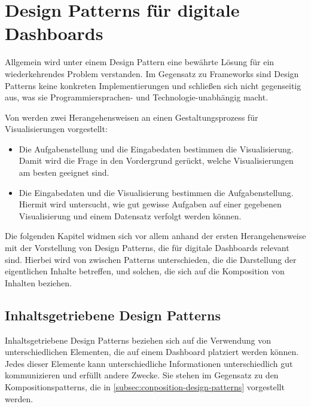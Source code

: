 \newpage


\section{Design Patterns für digitale Dashboards}\label{sec:design-patterns-list}

Allgemein wird unter einem Design Pattern eine bewährte Lösung für ein wiederkehrendes Problem verstanden.
Im Gegensatz zu Frameworks sind Design Patterns keine konkreten Implementierungen und schließen sich nicht gegenseitig aus, was sie Programmiersprachen- und Technologie-unabhängig macht.

Von \citeauthor[S. 2367]{Schulz.DesignSpaceVisualizationTasks.2013} werden zwei Herangehensweisen an einen Gestaltungsprozess für Visualisierungen vorgestellt:

\begin{itemize}
    \item Die Aufgabenstellung und die Eingabedaten bestimmen die Visualisierung.
    Damit wird die Frage in den Vordergrund gerückt, welche Visualisierungen am besten geeignet sind.
    \item Die Eingabedaten und die Visualisierung bestimmen die Aufgabenstellung.
    Hiermit wird untersucht, wie gut gewisse Aufgaben auf einer gegebenen Visualisierung und einem Datensatz verfolgt werden können.
\end{itemize}

Die folgenden Kapitel widmen sich vor allem anhand der ersten Herangehensweise mit der Vorstellung von Design Patterns, die für digitale Dashboards relevant sind.
Hierbei wird von \citeauthor[S. 3--5]{Bach.DashboardDesignPatterns.2023} zwischen Patterns unterschieden, die die Darstellung der eigentlichen Inhalte betreffen, und solchen, die sich auf die Komposition von Inhalten beziehen.

\subsection{Inhaltsgetriebene Design Patterns}\label{subsec:content-design-patterns}

Inhaltsgetriebene Design Patterns beziehen sich auf die Verwendung von unterschiedlichen Elementen, die auf einem Dashboard platziert werden können.
Jedes dieser Elemente kann unterschiedliche Informationen unterschiedlich gut kommunizieren und erfüllt andere Zwecke.
Sie stehen im Gegensatz zu den Kompositionspatterns, die in \autoref{subsec:conposition-design-patterns} vorgestellt werden.

